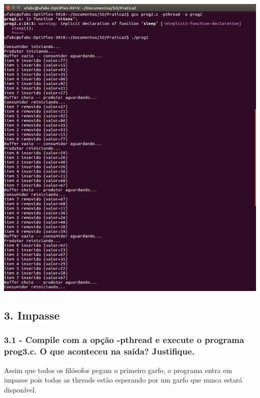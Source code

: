 \vspace{2em}
\begin{minipage}{\textwidth}
    \hspace{-1em}
    \centering
    \includegraphics[trim=0 0 0 0,clip,scale=.4]{pratica2/prog2.png}
    \label{prog4modpng}
    \hspace{1em}
\end{minipage}

\subsection*{3. Impasse}

\subsubsection{3.1 - Compile com a opção -pthread e execute o programa prog3.c. O que aconteceu na saída? Justiﬁque.}

Assim que todos os filósofos pegam o primeiro garfo, o programa entra em impasse pois todas as threads estão esperando por um garfo que nunca estará disponível.

